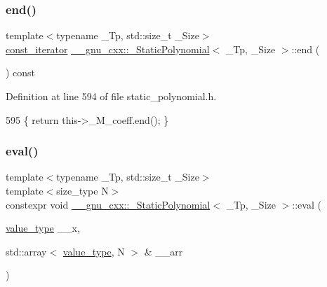 \subsubsection{\texorpdfstring{end()}{end()}\hspace{0.1cm}{\footnotesize\ttfamily [2/2]}}
{\footnotesize\ttfamily template$<$typename \+\_\+\+Tp, std\+::size\+\_\+t \+\_\+\+Size$>$ \\
\hyperlink{class____gnu__cxx_1_1__StaticPolynomial_a2e806a3a61788a2fad49adf67725ae7e}{const\+\_\+iterator} \hyperlink{class____gnu__cxx_1_1__StaticPolynomial}{\+\_\+\+\_\+gnu\+\_\+cxx\+::\+\_\+\+Static\+Polynomial}$<$ \+\_\+\+Tp, \+\_\+\+Size $>$\+::end (\begin{DoxyParamCaption}{ }\end{DoxyParamCaption}) const\hspace{0.3cm}{\ttfamily [inline]}}



Definition at line 594 of file static\+\_\+polynomial.\+h.


\begin{DoxyCode}
595       \{ \textcolor{keywordflow}{return} this->\_M\_coeff.end(); \}
\end{DoxyCode}
\mbox{\label{class____gnu__cxx_1_1__StaticPolynomial_a515532d18a28290cf869b3394c93f558}} 
\subsubsection{\texorpdfstring{eval()}{eval()}\hspace{0.1cm}{\footnotesize\ttfamily [1/2]}}
{\footnotesize\ttfamily template$<$typename \+\_\+\+Tp, std\+::size\+\_\+t \+\_\+\+Size$>$ \\
template$<$size\+\_\+type N$>$ \\
constexpr void \hyperlink{class____gnu__cxx_1_1__StaticPolynomial}{\+\_\+\+\_\+gnu\+\_\+cxx\+::\+\_\+\+Static\+Polynomial}$<$ \+\_\+\+Tp, \+\_\+\+Size $>$\+::eval (\begin{DoxyParamCaption}\item[{\hyperlink{class____gnu__cxx_1_1__StaticPolynomial_aad5f3d6d5876b6926b30724aeac649d6}{value\+\_\+type}}]{\+\_\+\+\_\+x,  }\item[{std\+::array$<$ \hyperlink{class____gnu__cxx_1_1__StaticPolynomial_aad5f3d6d5876b6926b30724aeac649d6}{value\+\_\+type}, N $>$ \&}]{\+\_\+\+\_\+arr }\end{DoxyParamCaption})\hspace{0.3cm}{\ttfamily [inline]}}



